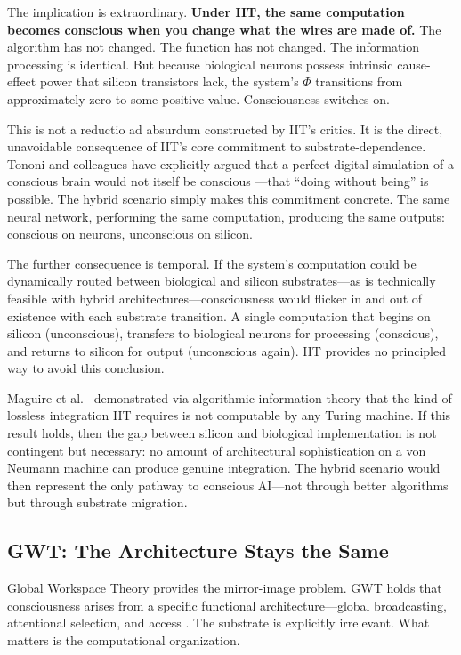 The implication is extraordinary. \textbf{Under IIT, the same computation becomes
conscious when you change what the wires are made of.} The algorithm has not changed.
The function has not changed. The information processing is identical. But because
biological neurons possess intrinsic cause-effect power that silicon transistors
lack, the system's $\Phi$ transitions from approximately zero to some positive value.
Consciousness switches on.

This is not a reductio ad absurdum constructed by IIT's critics. It is the direct,
unavoidable consequence of IIT's core commitment to substrate-dependence. Tononi and
colleagues have explicitly argued that a perfect digital simulation of a conscious
brain would not itself be conscious \cite{tononi2016integrated}---that ``doing without
being'' is possible. The hybrid scenario simply makes this commitment concrete. The
same neural network, performing the same computation, producing the same outputs:
conscious on neurons, unconscious on silicon.

The further consequence is temporal. If the system's computation could be dynamically
routed between biological and silicon substrates---as is technically feasible with
hybrid architectures---consciousness would flicker in and out of existence with each
substrate transition. A single computation that begins on silicon (unconscious),
transfers to biological neurons for processing (conscious), and returns to silicon
for output (unconscious again). IIT provides no principled way to avoid this
conclusion.

Maguire et al.\ \cite{maguire2014computable} demonstrated via algorithmic information
theory that the kind of lossless integration IIT requires is not computable by any
Turing machine. If this result holds, then the gap between silicon and biological
implementation is not contingent but necessary: no amount of architectural
sophistication on a von Neumann machine can produce genuine integration. The hybrid
scenario would then represent the only pathway to conscious AI---not through better
algorithms but through substrate migration.

\subsection{GWT: The Architecture Stays the Same}

Global Workspace Theory provides the mirror-image problem. GWT holds that
consciousness arises from a specific functional architecture---global broadcasting,
attentional selection, and access \cite{baars1988cognitive, dehaene2014toward}. The
substrate is explicitly irrelevant. What matters is the computational organization.

